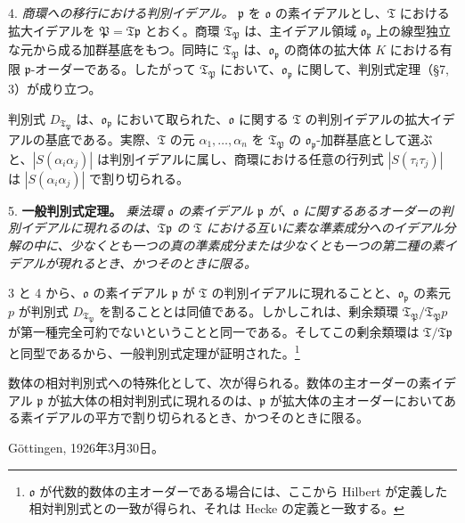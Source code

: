 \documentclass[11pt]{article}
\providecommand{\mT}{\mathfrak{T}}
\providecommand{\mo}{\mathfrak{o}}
\providecommand{\mP}{\mathfrak{P}}
\providecommand{\mpideal}{\mathfrak{p}}
\begin{document}
4. \emph{商環への移行における判別イデアル。} $\mpideal$ を $\mo$ の素イデアルとし、$\mT$ における拡大イデアルを $\mP=\mT\mpideal$ とおく。商環 $\mT_\mP$ は、主イデアル領域 $\mo_\mpideal$ 上の線型独立な元から成る加群基底をもつ。同時に $\mT_\mP$ は、$\mo_\mpideal$ の商体の拡大体 $K$ における有限 $\mpideal$-オーダーである。したがって $\mT_\mP$ において、$\mo_\mpideal$ に関して、判別式定理（\S 7, 3）が成り立つ。

判別式 $D_{\mT_\mP}$ は、$\mo_\mpideal$ において取られた、$\mo$ に関する $\mT$ の判別イデアルの拡大イデアルの基底である。実際、$\mT$ の元 $\alpha_1,\ldots,\alpha_n$ を $\mT_\mP$ の $\mo_\mpideal$-加群基底として選ぶと、$|S(\alpha_i\alpha_j)|$ は判別イデアルに属し、商環における任意の行列式 $|S(\tau_i\tau_j)|$ は $|S(\alpha_i\alpha_j)|$ で割り切られる。

5. \textbf{一般判別式定理。} \emph{乗法環 $\mo$ の素イデアル $\mpideal$ が、$\mo$ に関するあるオーダーの判別イデアルに現れるのは、$\mT\mpideal$ の $\mT$ における互いに素な準素成分へのイデアル分解の中に、少なくとも一つの真の準素成分または少なくとも一つの第二種の素イデアルが現れるとき、かつそのときに限る。}

3 と 4 から、$\mo$ の素イデアル $\mpideal$ が $\mT$ の判別イデアルに現れることと、$\mo_\mpideal$ の素元 $p$ が判別式 $D_{\mT_\mP}$ を割ることとは同値である。しかしこれは、剰余類環 $\mT_\mP/\mT_\mP p$ が第一種完全可約でないということと同一である。そしてこの剰余類環は $\mT/\mT\mpideal$ と同型であるから、一般判別式定理が証明された。\footnote{$\mo$ が代数的数体の主オーダーである場合には、ここから Hilbert が定義した相対判別式との一致が得られ、それは Hecke の定義と一致する。}

数体の相対判別式への特殊化として、次が得られる。数体の主オーダーの素イデアル $\mpideal$ が拡大体の相対判別式に現れるのは、$\mpideal$ が拡大体の主オーダーにおいてある素イデアルの平方で割り切られるとき、かつそのときに限る。

Göttingen, 1926年3月30日。
\end{document}
